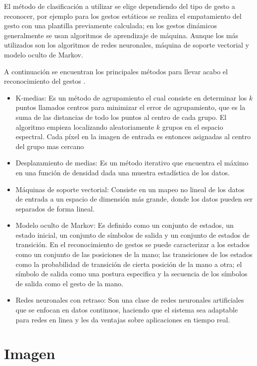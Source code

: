 El método de clasificación a utilizar se elige dependiendo del tipo de gesto a reconocer, por ejemplo para los gestos estáticos se realiza el empatamiento del gesto con una plantilla previamente calculada; en los gestos dinámicos generalmente  se usan algoritmos de aprendizaje de máquina. Aunque los más utilizados son los algoritmos de redes neuronales, máquina de soporte vectorial y modelo oculto de Markov.

A continuación se encuentran los principales métodos para llevar acabo el reconocimiento del gestos \citep{Rautaray2012}. 
\begin{itemize}
	\item K-medias: Es un método de agrupamiento el cual consiste en determinar los $k$ puntos llamados centros para minimizar el error de agrupamiento, que es la suma de las distancias de todo los puntos al centro de cada grupo. El algoritmo empieza localizando aleatoriamente $k$ grupos en el espacio espectral. Cada p\'ixel en la imagen de entrada es entonces asignadas al centro del grupo mas cercano  
	\item Desplazamiento de medias: Es un método iterativo que encuentra el máximo en una función de densidad dada una muestra estadística de los datos.
	\item Máquinas de soporte vectorial: Consiste en un mapeo no lineal de los datos de entrada a un espacio de dimensi\'on m\'as grande, donde los datos pueden ser separados de forma lineal.  
	\item Modelo oculto de Markov: Es definido como un conjunto de estados, un estado inicial, un conjunto de símbolos de salida y un conjunto de estados de transición. En el reconocimiento de gestos se puede caracterizar a los estados como un conjunto de las posiciones de la mano; las  transiciones de los estados como la probabilidad de transición de cierta posición de la mano a otra; el símbolo de salida como una postura especifica y la secuencia de los símbolos de salida como  el gesto de la mano.   
	\item Redes neuronales con retraso: Son una clase de redes neuronales artificiales que se enfocan en datos continuos, haciendo que el sistema sea adaptable para redes en linea y les da ventajas sobre aplicaciones en tiempo real. 
\end{itemize}  




\section{Imagen}\label{ImagenDef} 

